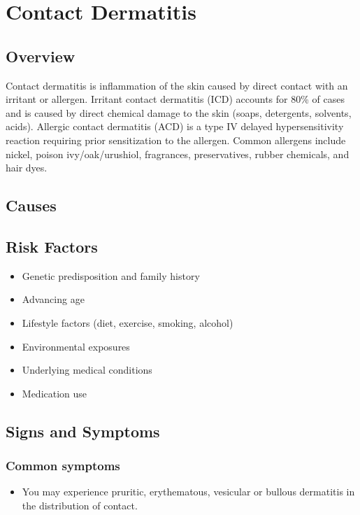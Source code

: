 \chapter{Contact Dermatitis}
\label{sec:Contact Dermatitis}

\section{Overview}
Contact dermatitis is inflammation of the skin caused by direct contact with an irritant or allergen. Irritant contact dermatitis (ICD) accounts for 80\% of cases and is caused by direct chemical damage to the skin (soaps, detergents, solvents, acids). Allergic contact dermatitis (ACD) is a type IV delayed hypersensitivity reaction requiring prior sensitization to the allergen. Common allergens include nickel, poison ivy/oak/urushiol, fragrances, preservatives, rubber chemicals, and hair dyes.
\section{Causes}
\section{Risk Factors}

\begin{itemize}[noitemsep]
  \item Genetic predisposition and family history
  \item Advancing age
  \item Lifestyle factors (diet, exercise, smoking, alcohol)
  \item Environmental exposures
  \item Underlying medical conditions
  \item Medication use
\end{itemize}
\section{Signs and Symptoms}

\subsection{Common symptoms}
\begin{itemize}[noitemsep]
  \item You may experience pruritic, erythematous, vesicular or bullous dermatitis in the distribution of contact. 
  \end{itemize}

